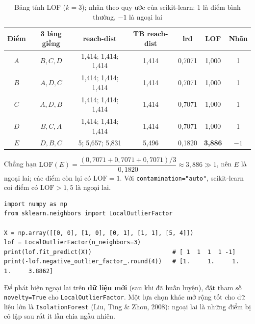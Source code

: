 \begin{table}[H]
\centering
\small
\begin{tabular}{|c|c|c|c|c|c|c|}
\hline
\textbf{Điểm} & \textbf{3 láng giềng} & \textbf{reach-dist} & \textbf{TB reach-dist} & \textbf{lrd} & \textbf{LOF} & \textbf{Nhãn} \\
\hline
$A$ & $B, C, D$ & 1,414; 1,414; 1,414 & 1,414 & 0,7071 & 1,000 & 1 \\ \hline
$B$ & $A, D, C$ & 1,414; 1,414; 1,414 & 1,414 & 0,7071 & 1,000 & 1 \\ \hline
$C$ & $A, D, B$ & 1,414; 1,414; 1,414 & 1,414 & 0,7071 & 1,000 & 1 \\ \hline
$D$ & $B, C, A$ & 1,414; 1,414; 1,414 & 1,414 & 0,7071 & 1,000 & 1 \\ \hline
$E$ & $D, B, C$ & 5; 5,657; 5,831 & 5,496 & 0,1820 & \textbf{3,886} & $-1$ \\ \hline
\end{tabular}
\caption{Bảng tính LOF ($k = 3$); nhãn theo quy ước của scikit-learn: 1 là điểm bình thường, $-1$ là ngoại lai}
\label{tab:lof}
\end{table}

Chẳng hạn $\text{LOF}(E) = \dfrac{(0{,}7071 + 0{,}7071 + 0{,}7071)/3}{0{,}1820} \approx 3{,}886 \gg 1$, nên $E$ là ngoại lai; các điểm còn lại có $\text{LOF} = 1$. Với \texttt{contamination="auto"}, scikit-learn coi điểm có $\text{LOF} > 1{,}5$ là ngoại lai.


\begin{lstlisting}[caption={Local Outlier Factor với scikit-learn}]
import numpy as np
from sklearn.neighbors import LocalOutlierFactor

X = np.array([[0, 0], [1, 0], [0, 1], [1, 1], [5, 4]])
lof = LocalOutlierFactor(n_neighbors=3)
print(lof.fit_predict(X))                       # [ 1  1  1  1 -1]
print(-lof.negative_outlier_factor_.round(4))   # [1.     1.     1.     1.     3.8862]
\end{lstlisting}

Để phát hiện ngoại lai trên \textbf{dữ liệu mới} (sau khi đã huấn luyện), đặt tham số \texttt{novelty=True} cho \texttt{LocalOutlierFactor}. Một lựa chọn khác mở rộng tốt cho dữ liệu lớn là \texttt{IsolationForest} (Liu, Ting \& Zhou, 2008): ngoại lai là những điểm bị cô lập sau rất ít lần chia ngẫu nhiên.

